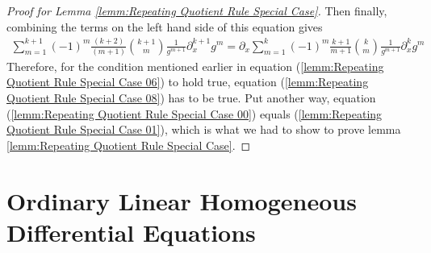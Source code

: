 \begin{proof}[Proof for Lemma \ref{lemm:Repeating Quotient Rule Special Case}]
Then finally, combining the terms on the left hand side of this equation gives
\begin{align}
\sum_{m=1}^{k+1}(-1)^m\frac{(k+2)}{(m+1)}\binom{k+1}{m}\frac{1}{g^{m+1}}\partial_x^{k+1}g^m  = \partial_x\sum_{m=1}^{k}(-1)^m\frac{k+1}{m+1}\binom{k}{m}\frac{1}{g^{m+1}}\partial_x^{k}g^m \label{lemm:Repeating Quotient Rule Special Case 08}
\end{align}
Therefore, for the condition mentioned earlier in equation (\ref{lemm:Repeating Quotient Rule Special Case 06}) to hold true, equation (\ref{lemm:Repeating Quotient Rule Special Case 08}) has to be true. Put another way, equation (\ref{lemm:Repeating Quotient Rule Special Case 00}) equals (\ref{lemm:Repeating Quotient Rule Special Case 01}), which is what we had to show to prove lemma \ref{lemm:Repeating Quotient Rule Special Case}.
\end{proof}
	













































\section{Ordinary Linear Homogeneous Differential Equations}

